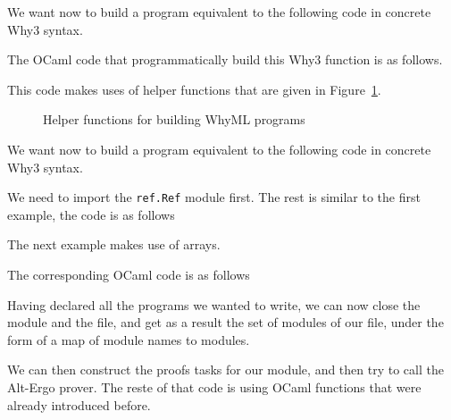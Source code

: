 We want now to build a program equivalent to the following code in concrete Why3 syntax.


The OCaml code that programmatically build this Why3 function is as follows.

This code makes uses of helper functions that are given in Figure~\ref{fig:helpers}.
\begin{figure}[t]
  
  \caption{Helper functions for building WhyML programs}
  \label{fig:helpers}
\end{figure}

We want now to build a program equivalent to the following code in concrete Why3 syntax.

We need to import the \verb|ref.Ref| module first. The rest is similar to the first example, the code is as follows


The next example makes use of arrays.

The corresponding OCaml code is as follows


Having declared all the programs we wanted to write, we can now close
the module and the file, and get as a result the set of modules of our
file, under the form of a map of module names to modules.


We can then construct the proofs tasks for our module, and then try to
call the Alt-Ergo prover. The reste of that code is using OCaml
functions that were already introduced before.


